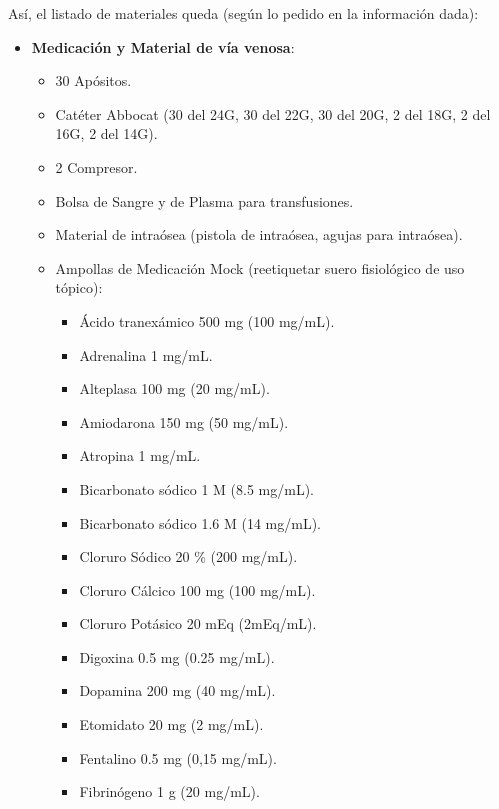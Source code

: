 Así, el listado de materiales queda (según lo pedido en la información dada):
\begin{itemize}[topsep=0pt, partopsep=0pt,itemsep=0pt,parsep=0pt]
    \item \textbf{Medicación y Material de vía venosa}:
    \begin{itemize}[topsep=0pt, partopsep=0pt,itemsep=0pt,parsep=0pt]
        \item 30 Apósitos.
        \item Catéter Abbocat (30 del 24G, 30 del 22G, 30 del 20G, 2 del 18G, 2 del 16G, 2 del 14G).
        \item 2 Compresor.
        \item Bolsa de Sangre y de Plasma para transfusiones.
        \item Material de intraósea (pistola de intraósea, agujas para intraósea).
        \item Ampollas de Medicación Mock (reetiquetar suero fisiológico de uso tópico):
        \vspace{-12.5pt}
        \begin{multicols}{2}
            \begin{itemize}[topsep=0pt, partopsep=0pt,itemsep=0pt,parsep=0pt]
                \item Ácido tranexámico 500 mg (100 mg/mL).
                \item Adrenalina 1 mg/mL.
                \item Alteplasa 100 mg (20 mg/mL).
                \item Amiodarona 150 mg (50 mg/mL).
                \item Atropina 1 mg/mL.
                \item Bicarbonato sódico 1 M (8.5 mg/mL).
                \item Bicarbonato sódico 1.6 M (14 mg/mL).
                \item Cloruro Sódico 20 \% (200 mg/mL).
                \item Cloruro Cálcico 100 mg (100 mg/mL).
                \item Cloruro Potásico 20 mEq (2mEq/mL).
                \item Digoxina 0.5 mg (0.25 mg/mL).
                \item Dopamina 200 mg (40 mg/mL).
                \item Etomidato 20 mg (2 mg/mL).
                \item Fentalino 0.5 mg (0,15 mg/mL).
                \item Fibrinógeno 1 g (20 mg/mL).

\end{itemize}
\end{multicols}
\end{itemize}
\end{itemize}
